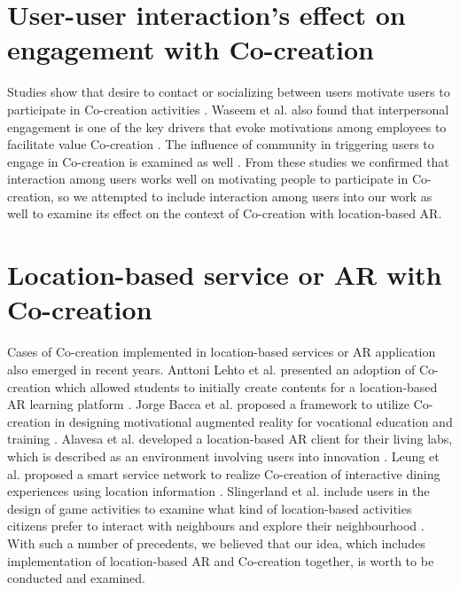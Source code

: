 \section{User-user interaction's effect on engagement with Co-creation}
Studies show that desire to contact or socializing between users motivate users to participate in Co-creation activities \cite{fernandes_remelhe_2016}\cite{engstrom_elg_2015}.
Waseem et al. also found that interpersonal engagement is one of the key drivers that evoke motivations among employees to facilitate value Co-creation \cite{waseem_biggemann_garry_2020}.
The influence of community in triggering users to engage in Co-creation is examined as well \cite{palma_trimi_hong_2018}\cite{zhang_kandampully_bilgihan_2015}.
From these studies we confirmed that interaction among users works well on motivating people to participate in Co-creation,
so we attempted to include interaction among users into our work as well to examine its effect on the context of Co-creation with location-based AR.

\section{Location-based service or AR with Co-creation}
Cases of Co-creation implemented in location-based services or AR application also emerged in recent years.
Anttoni Lehto et al. presented an adoption of Co-creation which allowed students to initially create contents for a location-based AR learning platform \cite{lehto_lautkankare_brander_alanissila_saari_salminen_2020}.
Jorge Bacca et al. proposed a framework to utilize Co-creation in designing motivational augmented reality for vocational education and training \cite{acosta_navarro_gesa_kinshuk_2019}.
Alavesa et al. developed a location-based AR client for their living labs, which is described as an environment involving users into innovation \cite{alavesa_2018}.
Leung et al. proposed a smart service network to realize Co-creation of interactive dining experiences using location information \cite{leung_loo_2020}.
Slingerland et al. include users in the design of game activities to examine what kind of location-based activities citizens prefer to interact with neighbours and explore their neighbourhood \cite{slingerland_fonseca_lukosch_brazier_2020}.
With such a number of precedents, we believed that our idea, which includes implementation of location-based AR and Co-creation together, is worth to be conducted and examined.
